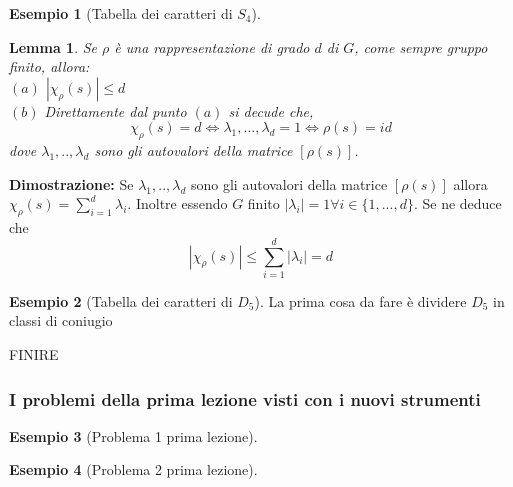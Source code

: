 \documentclass[11pt]{article}
\theoremstyle{plain}
\newtheorem{lemma}[thm]{Lemma}
\theoremstyle{definition}
\newtheorem{exmp}{Esempio}[section]
\theoremstyle{remark}
\begin{document}
\begin{exmp}[Tabella dei caratteri di $S_4$]
\begin{lemma}
Se $\rho$ è una rappresentazione di grado $d$ di $G$, come sempre gruppo finito, allora:\\
$(a)$ $|\chi_{\rho}(s)|\leq d$ \\
$(b)$ Direttamente dal punto $(a)$ si decude che, 
\[
\chi_{\rho}(s)=d\Leftrightarrow \lambda_1,...,\lambda_d=1\Leftrightarrow \rho(s)=id
\]
dove $\lambda_1,..,\lambda_d$ sono gli autovalori della matrice $[\rho(s)]$.
\end{lemma}
\textbf{Dimostrazione:} Se $\lambda_1,..,\lambda_d$ sono gli autovalori della matrice $[\rho(s)]$ allora $\chi_{\rho}(s)=\sum_{i=1}^{d}\lambda_i$. Inoltre essendo $G$ finito $|\lambda_i|=1\forall i\in \{1,...,d\}$. Se ne deduce che
\[
|\chi_{\rho}(s)|\leq \sum_{i=1}^d |\lambda_i|=d
\]



\end{exmp}





\begin{exmp}[Tabella dei caratteri di $D_5$]

La prima cosa da fare è dividere $D_5$ in classi di coniugio


FINIRE

\end{exmp}



\subsubsection{I problemi della prima lezione visti con i nuovi strumenti}
\begin{exmp}[Problema 1 prima lezione]


\end{exmp}

\begin{exmp}[Problema 2 prima lezione]


\end{exmp}
\end{document}
